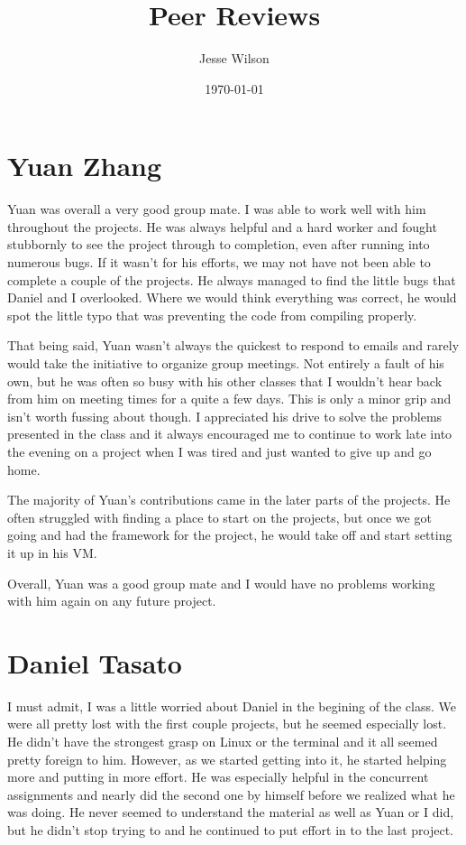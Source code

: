 \documentclass[a4paper]{article}
\title{Peer Reviews}
\author{Jesse Wilson}
\date{\today}
\begin{document}
\maketitle

\section{Yuan Zhang}

Yuan was overall a very good group mate. I was able to work well with him throughout the projects. He was always helpful and a hard worker and fought stubbornly to see the project through to completion, even after running into numerous bugs. If it wasn't for his efforts, we may not have not been able to complete a couple of the projects. He always managed to find the little bugs that Daniel and I overlooked. Where we would think everything was correct, he would spot the little typo that was preventing the code from compiling properly. 

That being said, Yuan wasn't always the quickest to respond to emails and rarely would take the initiative to organize group meetings. Not entirely a fault of his own, but he was often so busy with his other classes that I wouldn't hear back from him on meeting times for a quite a few days. This is only a minor grip and isn't worth fussing about though. I appreciated his drive to solve the problems presented in the class and it always encouraged me to continue to work late into the evening on a project when I was tired and just wanted to give up and go home.

The majority of Yuan's contributions came in the later parts of the projects. He often struggled with finding a place to start on the projects, but once we got going and had the framework for the project, he would take off and start setting it up in his VM. 

Overall, Yuan was a good group mate and I would have no problems working with him again on any future project.


\section{Daniel Tasato}

I must admit, I was a little worried about Daniel in the begining of the class. We were all pretty lost with the first couple projects, but he seemed especially lost. He didn't have the strongest grasp on Linux or the terminal and it all seemed pretty foreign to him. However, as we started getting into it, he started helping more and putting in more effort. He was especially helpful in the concurrent assignments and nearly did the second one by himself before we realized what he was doing. He never seemed to understand the material as well as Yuan or I did, but he didn't stop trying to and he continued to put effort in to the last project. 
\end{document}
